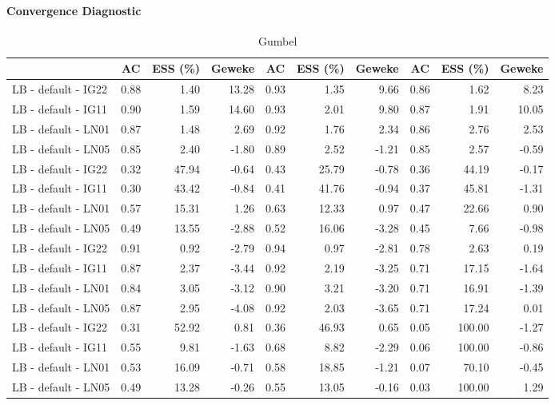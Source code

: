\documentclass{amsart}
\begin{document}
\paragraph{Convergence Diagnostic}
\begin{table}[ht]
	\centering
	\caption{Gumbel}
	\scriptsize{
		\begin{tabular}{l|crr|crr|crr}
			\toprule
			& AC & ESS (\%) & Geweke & AC & ESS (\%) & Geweke & AC & ESS (\%) & Geweke \\ 
			\midrule
			LB - default - IG22 & 0.88 & 1.40 & 13.28 & 0.93 & 1.35 & 9.66 & 0.86 & 1.62 & 8.23 \\ 
			LB - default - IG11 & 0.90 & 1.59 & 14.60 & 0.93 & 2.01 & 9.80 & 0.87 & 1.91 & 10.05 \\ 
			LB - default - LN01 & 0.87 & 1.48 & 2.69 & 0.92 & 1.76 & 2.34 & 0.86 & 2.76 & 2.53 \\ 
			LB - default - LN05 & 0.85 & 2.40 & -1.80 & 0.89 & 2.52 & -1.21 & 0.85 & 2.57 & -0.59 \\ 
			\midrule
			LB - default - IG22 & 0.32 & 47.94 & -0.64 & 0.43 & 25.79 & -0.78 & 0.36 & 44.19 & -0.17 \\ 
			LB - default - IG11 & 0.30 & 43.42 & -0.84 & 0.41 & 41.76 & -0.94 & 0.37 & 45.81 & -1.31 \\ 
			LB - default - LN01 & 0.57 & 15.31 & 1.26 & 0.63 & 12.33 & 0.97 & 0.47 & 22.66 & 0.90 \\ 
			LB - default - LN05 & 0.49 & 13.55 & -2.88 & 0.52 & 16.06 & -3.28 & 0.45 & 7.66 & -0.98 \\ 
			\midrule
			LB - default - IG22 & 0.91 & 0.92 & -2.79 & 0.94 & 0.97 & -2.81 & 0.78 & 2.63 & 0.19 \\ 
			LB - default - IG11 & 0.87 & 2.37 & -3.44 & 0.92 & 2.19 & -3.25 & 0.71 & 17.15 & -1.64 \\ 
			LB - default - LN01 & 0.84 & 3.05 & -3.12 & 0.90 & 3.21 & -3.20 & 0.71 & 16.91 & -1.39 \\ 
			LB - default - LN05 & 0.87 & 2.95 & -4.08 & 0.92 & 2.03 & -3.65 & 0.71 & 17.24 & 0.01 \\ 
			\midrule
			LB - default - IG22 & 0.31 & 52.92 & 0.81 & 0.36 & 46.93 & 0.65 & 0.05 & 100.00 & -1.27 \\ 
			LB - default - IG11 & 0.55 & 9.81 & -1.63 & 0.68 & 8.82 & -2.29 & 0.06 & 100.00 & -0.86 \\ 
			LB - default - LN01 & 0.53 & 16.09 & -0.71 & 0.58 & 18.85 & -1.21 & 0.07 & 70.10 & -0.45 \\ 
			LB - default - LN05 & 0.49 & 13.28 & -0.26 & 0.55 & 13.05 & -0.16 & 0.03 & 100.00 & 1.29 \\ 

\end{tabular}}
\end{table}
\end{document}
